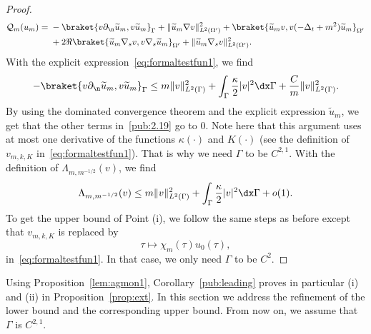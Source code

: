 \begin{proof}
\begin{equation}
\begin{aligned}
\mathcal{Q}_m(u_m)={}&-\braket{v\partial_\n\widetilde u_m,v\widetilde u_m}_\Gamma+\|\widetilde u_m\nabla v\|_{L^2(\Omega')}^2+\braket{\widetilde u_mv,v(-\Delta_t+m^2)\widetilde u_m}_{\Omega'}\\&+2\Re\braket{\widetilde u_m\nabla_sv,v\nabla_s\widetilde u_m}_{\Omega'}+\|\widetilde u_m\nabla_sv\|_{L^2(\Omega')}^2.
\end{aligned}\end{equation}
With the explicit expression~\eqref{eq:formaltestfun1}, we find
\begin{equation}\label{pub:2.20}-\braket{v\partial_\n\widetilde u_m,v\widetilde u_m}_\Gamma\leq m\|v\|_{L^2(\Gamma)}^2+\int_\Gamma\frac\kappa2|v|^2\dx\Gamma+\frac Cm\|v\|_{L^2(\Gamma)}^2.\end{equation}
By using the dominated convergence theorem and the explicit expression $\widetilde u_m$, we get that the other terms in~\eqref{pub:2.19} go to $0$. Note here that this argument uses at most one derivative of the functions $\kappa(\cdot)$ and $K(\cdot)$ (see the definition of $v_{m,k,K}$ in~\eqref{eq:formaltestfun1}). That is why we need $\Gamma$ to be $C^{2,1}$.
With the definition of $\Lambda_{m,m^{-1/2}}(v)$, we find
\[\Lambda_{m,m^{-1/2}}(v)\leq m\|v\|_{L^2(\Gamma)}^2+\int_\Gamma\frac\kappa2|v|^2\dx\Gamma+o(1).\]
To get the upper bound of Point (i), we follow the same steps as before except that $v_{m,k,K}$ is replaced by
\[\tau\longmapsto\chi_m(\tau)u_0(\tau),\]
in~\eqref{eq:formaltestfun1}. In that case, we only need $\Gamma$ to be $C^2$.
\end{proof}
Using Proposition~\ref{lem:agmon1}, Corollary~\ref{pub:leading} proves in particular (i) and (ii) in Proposition~\ref{prop:ext}. In this section we address the refinement of the lower bound and the corresponding upper bound. From now on, we assume that $\Gamma$ is $C^{2,1}$.
